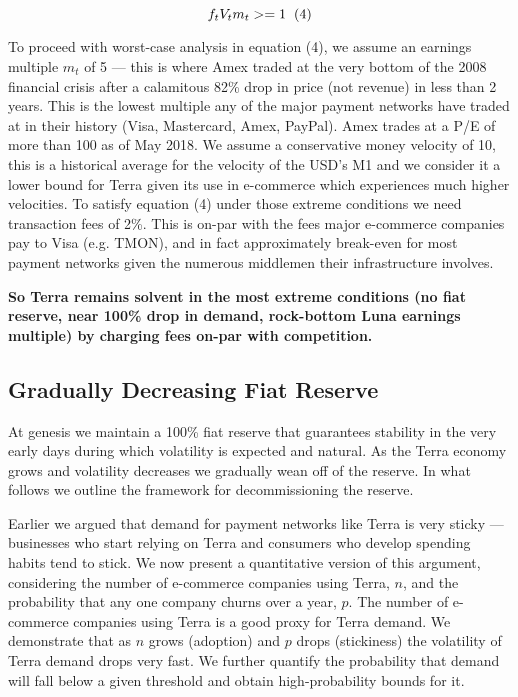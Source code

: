 \documentclass{article}
\begin{document}
$$f_tV_tm_t >= 1 \hspace{0.2cm} (4)$$

To proceed with worst-case analysis in equation (4), we assume an earnings multiple $m_t$ of 5 — this is where Amex traded at the very bottom of the 2008 financial crisis after a calamitous 82\% drop in price (not revenue) in less than 2 years. This is the lowest multiple any of the major payment networks have traded at in their history (Visa, Mastercard, Amex, PayPal). Amex trades at a P/E of more than 100 as of May 2018. We assume a conservative money velocity of 10, this is a historical average for the velocity of the USD's M1 and we consider it a lower bound for Terra given its use in e-commerce which experiences much higher velocities. To satisfy equation (4) under those extreme conditions we need transaction fees of 2\%. This is on-par with the fees major e-commerce companies pay to Visa (e.g. TMON), and in fact approximately break-even for most payment networks given the numerous middlemen their infrastructure involves. 

\textbf{So Terra remains solvent in the most extreme conditions (no fiat reserve, near 100\% drop in demand, rock-bottom Luna earnings multiple) by charging fees on-par with competition.}

\subsection{Gradually Decreasing Fiat Reserve}

At genesis we maintain a 100\% fiat reserve that guarantees stability in the very early days during which volatility is expected and natural. As the Terra economy grows and volatility decreases we gradually wean off of the reserve. In what follows we outline the framework for decommissioning the reserve.

Earlier we argued that demand for payment networks like Terra is very sticky — businesses who start relying on Terra and consumers who develop spending habits tend to stick. We now present a quantitative version of this argument, considering the number of e-commerce companies using Terra, $n$, and the probability that any one company churns over a year, $p$. The number of e-commerce companies using Terra is a good proxy for Terra demand. We demonstrate that as $n$ grows (adoption) and $p$ drops (stickiness) the volatility of Terra demand drops very fast. We further quantify the probability that demand will fall below a given threshold and obtain high-probability bounds for it.
\end{document}
